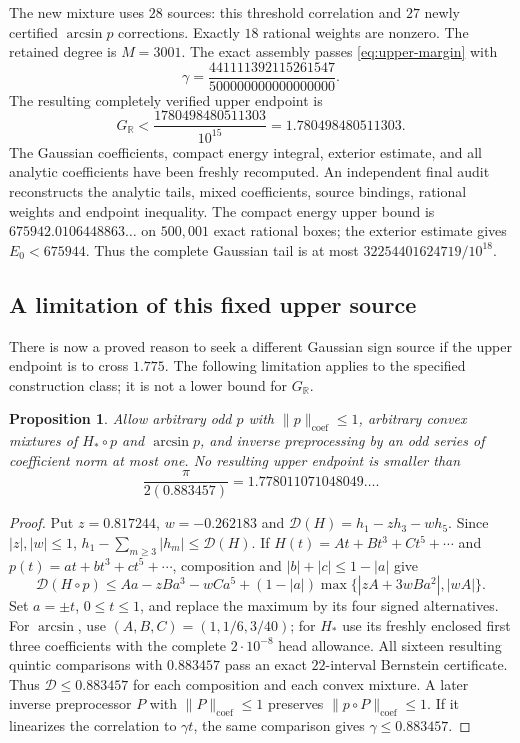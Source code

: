 \documentclass[11pt]{article}
\newtheorem{proposition}{Proposition}
\newcommand{\R}{\mathbb R}
\newcommand{\GR}{G_{\R}}
\newcommand{\cnorm}[1]{\lVert #1\rVert_{\mathrm{coef}}}
\begin{document}
The new mixture uses $28$ sources: this threshold correlation and $27$ newly certified $\arcsin p$ corrections. Exactly $18$ rational weights are nonzero. The retained degree is $M=3001$. The exact assembly passes \eqref{eq:upper-margin} with
\begin{equation}\label{eq:new-gamma}
 \gamma=\frac{441111392115261547}{500000000000000000}.
\end{equation}
The resulting completely verified upper endpoint is
\begin{equation}\label{eq:new-upper}
 \GR<\frac{1780498480511303}{10^{15}}
 =1.780498480511303.
\end{equation}
The Gaussian coefficients, compact energy integral, exterior estimate, and all analytic coefficients have been freshly recomputed. An independent final audit reconstructs the analytic tails, mixed coefficients, source bindings, rational weights and endpoint inequality. The compact energy upper bound is $675942.0106448863\ldots$ on $500{,}001$ exact rational boxes; the exterior estimate gives $E_0<675944$. Thus the complete Gaussian tail is at most $32254401624719/10^{18}$.

\subsection{A limitation of this fixed upper source}
There is now a proved reason to seek a different Gaussian sign source if the upper endpoint is to cross $1.775$. The following limitation applies to the specified construction class; it is not a lower bound for $\GR$.
\begin{proposition}\label{prop:source-barrier}
Allow arbitrary odd $p$ with $\cnorm p\le1$, arbitrary convex mixtures of $H_*\circ p$ and $\arcsin p$, and inverse preprocessing by an odd series of coefficient norm at most one. No resulting upper endpoint is smaller than
\begin{equation*}
 \frac{\pi}{2(0.883457)}=1.778011071048049\ldots.
\end{equation*}
\end{proposition}
\begin{proof}
Put $z=0.817244$, $w=-0.262183$ and $\mathcal D(H)=h_1-zh_3-wh_5$. Since $|z|,|w|\le1$, $h_1-\sum_{m\ge3}|h_m|\le\mathcal D(H)$. If $H(t)=At+Bt^3+Ct^5+\cdots$ and $p(t)=at+bt^3+ct^5+\cdots$, composition and $|b|+|c|\le1-|a|$ give
\begin{equation*}
 \mathcal D(H\circ p)\le Aa-zBa^3-wCa^5
 +(1-|a|)\max\{|zA+3wBa^2|,|wA|\}.
\end{equation*}
Set $a=\pm t$, $0\le t\le1$, and replace the maximum by its four signed alternatives. For $\arcsin$, use $(A,B,C)=(1,1/6,3/40)$; for $H_*$ use its freshly enclosed first three coefficients with the complete $2\cdot10^{-8}$ head allowance. All sixteen resulting quintic comparisons with $0.883457$ pass an exact $22$-interval Bernstein certificate. Thus $\mathcal D\le0.883457$ for each composition and each convex mixture. A later inverse preprocessor $P$ with $\cnorm P\le1$ preserves $\cnorm{p\circ P}\le1$. If it linearizes the correlation to $\gamma t$, the same comparison gives $\gamma\le0.883457$.
\end{proof}
\end{document}
